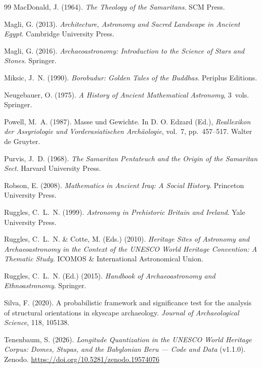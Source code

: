 \documentclass[HARVARD,twocolumn]{USG}
\begin{document}
\begin{thebibliography}{99}
MacDonald, J. (1964).
\textit{The Theology of the Samaritans}.
SCM Press.

Magli, G. (2013).
\textit{Architecture, Astronomy and Sacred Landscape in Ancient Egypt}.
Cambridge University Press.

Magli, G. (2016).
\textit{Archaeoastronomy: Introduction to the Science of Stars and Stones}.
Springer.

Miksic, J.~N. (1990).
\textit{Borobudur: Golden Tales of the Buddhas}.
Periplus Editions.

Neugebauer, O. (1975).
\textit{A History of Ancient Mathematical Astronomy}, 3~vols.
Springer.

Powell, M.~A. (1987).
Masse und Gewichte.
In D. O. Edzard (Ed.),
\textit{Reallexikon der Assyriologie und Vorderasiatischen Arch\"aologie},
vol.~7, pp.~457--517. Walter de Gruyter.

Purvis, J.~D. (1968).
\textit{The Samaritan Pentateuch and the Origin of the Samaritan Sect}.
Harvard University Press.

Robson, E. (2008).
\textit{Mathematics in Ancient Iraq: A Social History}.
Princeton University Press.

Ruggles, C.~L.~N. (1999).
\textit{Astronomy in Prehistoric Britain and Ireland}.
Yale University Press.

Ruggles, C.~L.~N. \& Cotte, M. (Eds.) (2010).
\textit{Heritage Sites of Astronomy and Archaeoastronomy in the Context
of the UNESCO World Heritage Convention: A Thematic Study}.
ICOMOS \& International Astronomical Union.

Ruggles, C.~L.~N. (Ed.) (2015).
\textit{Handbook of Archaeoastronomy and Ethnoastronomy}.
Springer.

Silva, F. (2020).
A probabilistic framework and significance test for the analysis
of structural orientations in skyscape archaeology.
\textit{Journal of Archaeological Science}, 118, 105138.

Tenenbaum, S. (2026).
\textit{Longitude Quantization in the UNESCO World Heritage Corpus: Domes, Stupas, and the Babylonian Beru --- Code and Data} (v1.1.0).
Zenodo. \url{https://doi.org/10.5281/zenodo.19574076}


\end{thebibliography}
\end{document}

